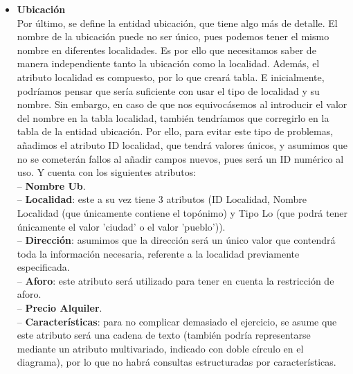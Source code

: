 \documentclass[12pt]{article}
\begin{document}
\begin{itemize}
        \item \textbf{Ubicación}\\
            Por último, se define la entidad ubicación, que tiene algo más de detalle. El nombre de la ubicación puede no ser único, pues podemos tener el mismo
            nombre en diferentes localidades. Es por ello que necesitamos saber de manera independiente tanto la ubicación como la localidad.
            Además, el atributo localidad es compuesto, por lo que creará tabla. E inicialmente, podríamos pensar que sería suficiente con usar el tipo de localidad 
            y su nombre. Sin embargo, en caso de que nos equivocásemos al introducir el valor del nombre en la tabla localidad, también tendríamos que corregirlo
            en la tabla de la entidad ubicación. Por ello, para evitar este tipo de problemas, añadimos el atributo ID localidad, que tendrá valores únicos, 
            y asumimos que no se cometerán fallos al añadir campos nuevos, pues será un ID numérico al uso. 
            Y cuenta con los siguientes atributos: \\
                \hspace{0.5cm} -- {\bfseries Nombre Ub}. \\
                \hspace{0.5cm} -- {\bfseries Localidad}: este a su vez tiene 3 atributos (ID Localidad, Nombre Localidad (que únicamente contiene el 
                topónimo) y Tipo Lo (que podrá tener únicamente el valor 'ciudad' o el valor 'pueblo')). \\
                \hspace{0.5cm} -- {\bfseries Dirección}: asumimos que la dirección será un único valor que contendrá toda la información necesaria,
                referente a la localidad previamente especificada. \\
                \hspace{0.5cm} -- {\bfseries Aforo}: este atributo será utilizado para tener en cuenta la restricción de aforo. \\
                \hspace{0.5cm} -- {\bfseries Precio Alquiler}. \\
                \hspace{0.5cm} -- {\bfseries Características}: para no complicar demasiado el ejercicio, se asume que este atributo será una cadena de texto 
                (también podría representarse mediante un atributo multivariado, indicado con doble círculo en el diagrama), por lo que no habrá consultas 
                estructuradas por características.

    \end{itemize}
\end{document}
